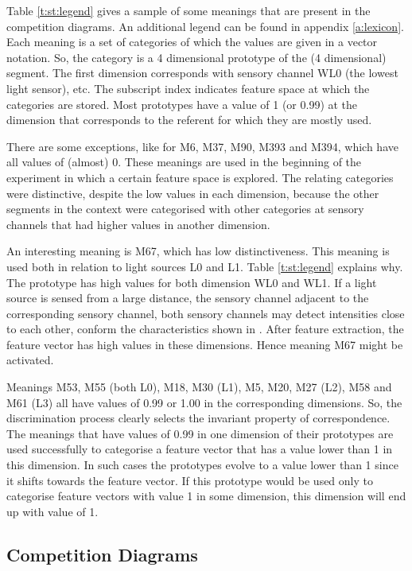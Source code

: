 Table \ref{t:st:legend} gives a sample of some meanings that are present in the competition diagrams. An additional legend can be found in appendix \ref{a:lexicon}. Each meaning is a set of categories of which the values are given in a vector notation. So, the category is a 4 dimensional prototype of the (4 dimensional) segment. The first dimension corresponds with sensory channel WL0 (the lowest light sensor), etc. The subscript index indicates feature space at which the categories are stored. Most prototypes have a value of 1 (or 0.99) at the dimension that corresponds to the referent for which they are mostly used. 

There are some exceptions, like for M6, M37, M90, M393 and M394, which have all values of (almost) 0. These meanings are used in the beginning of the experiment in which a certain feature space is explored. The relating categories were distinctive, despite the low values in each dimension, because the other segments in the context were categorised with other categories at sensory channels that had higher values in another dimension.

An interesting meaning is M67, which has low distinctiveness. This meaning is used both in relation to light sources L0 and L1. Table \ref{t:st:legend} explains why. The prototype has high values for both dimension WL0 and WL1. If a light source is sensed from a large distance, the sensory channel adjacent to the corresponding sensory channel, both sensory channels may detect intensities close to each other, conform the characteristics shown in . After feature extraction, the feature vector has high values in these dimensions. Hence meaning M67 might be activated. 


Meanings M53, M55 (both L0), M18, M30 (L1), M5, M20, M27 (L2), M58 and M61 (L3) all have values of 0.99 or 1.00 in the corresponding dimensions.  So, the discrimination process clearly selects the invariant property of correspondence. The meanings that have values of 0.99 in one dimension of their prototypes are used successfully to categorise a feature vector that has a value lower than 1 in this dimension. In such cases the prototypes evolve to a value lower than 1 since it shifts towards the feature vector. If this prototype would be used only to categorise feature vectors with value 1 in some dimension, this dimension will end up with value of 1.


\subsection{Competition Diagrams}\label{s:basic:comp}

